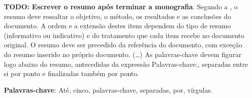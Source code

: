 \documentclass[12pt,
openright, 
oneside, %
a4paper,    %
brazil]{facom-ufu-abntex2}
\begin{document}





\begin{resumo}


\textbf{TODO: Escrever o resumo após terminar a monografia}. Segundo a , o resumo deve ressaltar o
objetivo, o método, os resultados e as conclusões do documento. A ordem e a extensão
destes itens dependem do tipo de resumo (informativo ou indicativo) e do
tratamento que cada item recebe no documento original. O resumo deve ser
precedido da referência do documento, com exceção do resumo inserido no
próprio documento. (\ldots) As palavras-chave devem figurar logo abaixo do
resumo, antecedidas da expressão Palavras-chave:, separadas entre si por
ponto e finalizadas também por ponto.

\vspace{\onelineskip}
  
\noindent
\textbf{Palavras-chave}: Até, cinco, palavras-chave, separadas, por, vírgulas.

\end{resumo}





\end{document}

